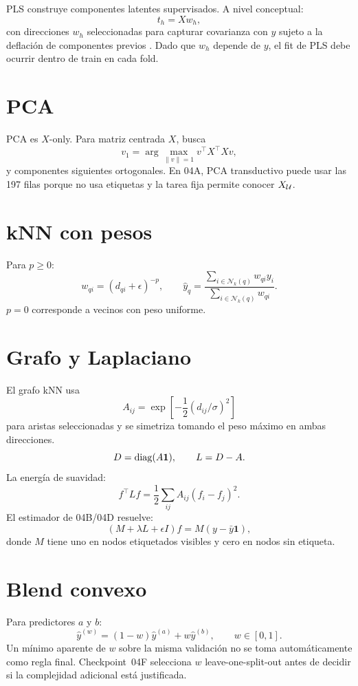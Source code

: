PLS construye componentes latentes supervisados. A nivel conceptual:
\[
t_h=Xw_h,
\]
con direcciones $w_h$ seleccionadas para capturar covarianza con $y$ sujeto a la deflación de
componentes previos \citep{Wold2001}. Dado que $w_h$ depende de $y$, el fit de PLS debe ocurrir
dentro de train en cada fold.

\section{PCA}

PCA es $X$-only. Para matriz centrada $X$, busca
\[
v_1=\arg\max_{\|v\|=1}v^\top X^\top Xv,
\]
y componentes siguientes ortogonales. En 04A, PCA transductivo puede usar las 197 filas porque
no usa etiquetas y la tarea fija permite conocer $X_{\mathcal{U}}$.

\section{kNN con pesos}

Para $p\ge0$:
\[
w_{qi}
=
(d_{qi}+\epsilon)^{-p},
\qquad
\hat y_q
=
\frac{\sum_{i\in\mathcal N_k(q)}w_{qi}y_i}
{\sum_{i\in\mathcal N_k(q)}w_{qi}}.
\]
$p=0$ corresponde a vecinos con peso uniforme.

\section{Grafo y Laplaciano}

El grafo kNN usa
\[
A_{ij}
=
\exp\left[-\frac12(d_{ij}/\sigma)^2\right]
\]
para aristas seleccionadas y se simetriza tomando el peso máximo en ambas direcciones.
\[
D=\operatorname{diag}(A\mathbf 1),\qquad
L=D-A.
\]
La energía de suavidad:
\[
f^\top Lf
=
\frac12\sum_{ij}A_{ij}(f_i-f_j)^2.
\]
El estimador de 04B/04D resuelve:
\[
(M+\lambda L+\epsilon I)f
=
M(y-\bar y\mathbf1),
\]
donde $M$ tiene uno en nodos etiquetados visibles y cero en nodos sin etiqueta.

\section{Blend convexo}

Para predictores $a$ y $b$:
\[
\hat y^{(w)}=(1-w)\hat y^{(a)}+w\hat y^{(b)},
\qquad w\in[0,1].
\]
Un mínimo aparente de $w$ sobre la misma validación no se toma automáticamente como regla
final. Checkpoint~04F selecciona $w$ leave-one-split-out antes de decidir si la complejidad
adicional está justificada.


